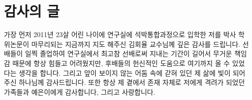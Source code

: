 \documentclass[11pt]{hyu_thesis}
\begin{document}
\chapter*{감사의 글}

가장 먼저 2011년 23살 어린 나이에 연구실에 석박통합과정으로 입학한 저를 박사 학위논문이 마무리되는 지금까지 지도 해주신 김회율 교수님께 깊은 감사를 드립니다. 선배들이 일찍 졸업하여 연구실에서 최고참 선배로써 지내는 기간이 길어서 무거운 책임감 때문에 항상 힘들고 어려웠지만, 후배들의 헌신적인 도움으로 여기까지 올 수 있었다는 생각을 합니다. 그리고 앞이 보이지 않는 어둠 속에 갇혀 있던 제 삶에 빛이 되어 주신 하나님께 감사드립니다. 또한 항상 제 곁에서 존재 자체로 저에게 격려가 되었던 가족들과 예은이에게 감사합니다, 그리고 사랑합니다.


\end{document}
